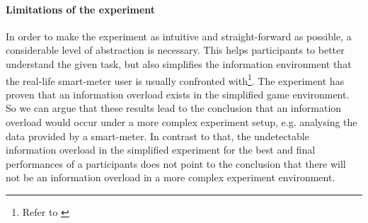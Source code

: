 \paragraph{Limitations of the experiment}
In order to make the experiment as intuitive and straight-forward as possible, a considerable level of abstraction is necessary. This helps participants to better understand the given task, but also simplifies the information environment that the real-life smart-meter user is usually confronted with\footnote{Refer to \cite{Jacoby1984}}. The experiment has proven that an information overload exists in the simplified game environment.  So we can argue that these results lead to the conclusion that an information overload would occur under a more complex experiment setup, e.g. analysing the data provided by a smart-meter. 
In contrast to that, the undetectable information overload in the simplified experiment for the best and final performances of a participants does not point to the conclusion that there will not be an information overload in a more complex experiment environment.


%
%
%
%


